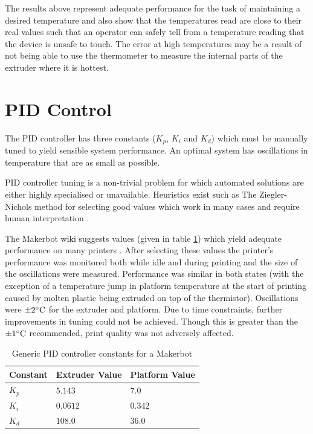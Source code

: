 		The results above represent adequate performance for the task of maintaining
		a desired temperature and also show that the temperatures read are close to
		their real values such that an operator can safely tell from a temperature
		reading that the device is unsafe to touch. The error at high temperatures
		may be a result of not being able to use the thermometer to measure the
		internal parts of the extruder where it is hottest.
	
	\section{PID Control}
		
		\label{sec:pidtraning}
		
		The PID controller has three constants ($K_p$, $K_i$ and $K_d$) which must
		be manually tuned to yield sensible system performance. An optimal system
		has oscillations in temperature that are as small as possible.
		
		PID controller tuning is a non-trivial problem for which automated solutions
		are either highly specialised or unavailable. Heuristics exist such as The
		Ziegler-Nichols method for selecting good values which work in many cases
		and require human interpretation \cite{ziegler}.
		
		The Makerbot wiki suggests values (given in table \ref{tab:makerbotpid})
		which yield adequate performance on many printers \cite{makerbotpid}. After
		selecting these values the printer's performance was monitored both while
		idle and during printing and the size of the oscillations were measured.
		Performance was similar in both states (with the exception of a temperature
		jump in platform temperature at the start of printing caused by molten
		plastic being extruded on top of the thermistor). Oscillations were
		$\pm2^\circ\textrm{C}$ for the extruder and platform. Due to time constraints, further
		improvements in tuning could not be achieved. Though this is greater than
		the $\pm1^\circ\textrm{C}$ recommended, print quality was not adversely affected.
		
		\begin{table}
			\centering
			\begin{tabular}{l l l}
				\toprule
				Constant & Extruder Value & Platform Value \\
				\midrule
				$K_p$    & $5.143$        & $7.0  $  \\
				$K_i$    & $0.0612$       & $0.342$ \\
				$K_d$    & $108.0$        & $36.0 $  \\
				\bottomrule
			\end{tabular}
			
			\caption{Generic PID controller constants for a Makerbot
			         \cite{makerbotpid}}
			\label{tab:makerbotpid}
		\end{table}
	
